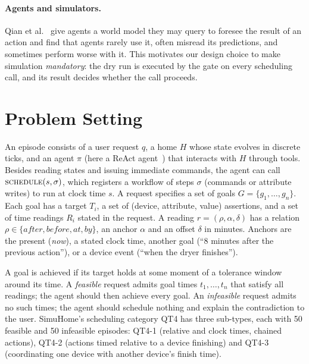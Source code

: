 \documentclass[sigconf]{aamas}
\begin{document}
\paragraph{Agents and simulators.}
Qian et al.~\cite{qian2026worldmodel} give agents a world model they may query to foresee the result of an action
and find that agents rarely use it, often misread its predictions, and sometimes perform worse with it. This
motivates our design choice to make simulation \emph{mandatory}: the dry run is executed by the gate on every
scheduling call, and its result decides whether the call proceeds.

\section{Problem Setting}

An episode consists of a user request $q$, a home $H$ whose state evolves in discrete ticks, and an agent $\pi$
(here a ReAct agent~\cite{yao2023react}) that interacts with $H$ through tools. Besides reading states and issuing
immediate commands, the agent can call $\textsc{schedule}(s, \sigma)$, which registers a workflow of steps
$\sigma$ (commands or attribute writes) to run at clock time $s$. A request specifies a set of goals
$G=\{g_1,\dots,g_n\}$. Each goal has a target $T_i$, a set of (device, attribute, value) assertions, and a set of
time readings $R_i$ stated in the request. A reading $r=(\rho, \alpha, \delta)$ has a relation
$\rho \in \{\textit{after}, \textit{before}, \textit{at}, \textit{by}\}$, an anchor $\alpha$ and an offset $\delta$
in minutes. Anchors are the present (\textit{now}), a stated clock time, another goal (``8 minutes after the
previous action''), or a device event (``when the dryer finishes'').

A goal is achieved if its target holds at some moment of a tolerance window around its time. A \emph{feasible}
request admits goal times $t_1,\dots,t_n$ that satisfy all readings; the agent should then achieve every goal.
An \emph{infeasible} request admits no such times; the agent should schedule nothing and explain the
contradiction to the user. SimuHome's scheduling category QT4 has three sub-types, each with 50 feasible and 50
infeasible episodes: QT4-1 (relative and clock times, chained actions), QT4-2 (actions timed relative to a device
finishing) and QT4-3 (coordinating one device with another device's finish time).
\end{document}
